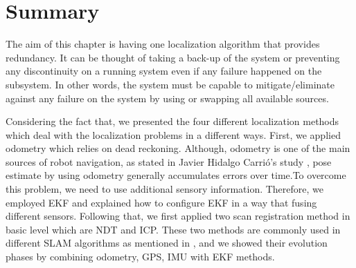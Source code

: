 \section{Summary}
The aim of this chapter is having one localization algorithm that provides redundancy. It can be thought of taking a back-up of the system or preventing any discontinuity on a running system even if any failure happened on the subsystem. In other words, the system must be capable to mitigate/eliminate against any failure on the system by using or swapping all available sources.%
\par Considering the fact that, we presented the four different localization methods which deal with the localization problems in a different ways. First, we applied odometry which relies on dead reckoning. Although, odometry is one of the main sources of robot navigation, as stated  in Javier Hidalgo Carrió's study \cite{odomja}, pose estimate by using odometry generally accumulates errors over time.To overcome this problem, we need to use additional sensory information. Therefore, we employed EKF and explained how to configure EKF in a way that fusing different sensors. Following that, we first applied two scan registration method in basic level which are NDT and ICP. These two methods are commonly used in different SLAM algorithms as mentioned in \cite{6D_SLAM}, \cite{NDT_SLAM} and we showed their evolution phases by combining odometry, GPS, IMU with EKF methods.


